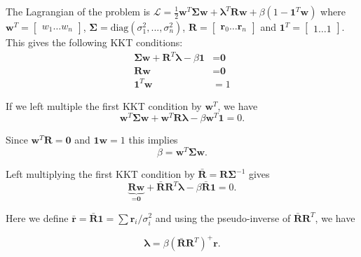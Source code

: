\documentclass[conference]{IEEEtran}
\begin{document}
The Lagrangian of the problem is $\mathcal{L} = \frac{1}{2}\textbf{w}^T \bm{\Sigma} \textbf{w} + \bm{\lambda}^T \textbf{R}\textbf{w} + \beta \left( 1 - \textbf{1}^T \textbf{w} \right)$ where $\textbf{w}^T = \left[\begin{matrix} w_1 \dots w_n \end{matrix}\right]$, $\bm{\Sigma} = \text{diag}(\sigma_1^2, ..., \sigma_n^2)$, $\textbf{R} = \left[\begin{matrix} \textbf{r}_0 \dots \textbf{r}_n\end{matrix}\right]$ and $\textbf{1}^T = \left[\begin{matrix}1 \dots 1\end{matrix}\right]$. This gives the following KKT conditions:
\begin{equation}
\begin{split}
  \bm{\Sigma}\textbf{w} + \textbf{R}^T \bm{\lambda} - \beta \textbf{1} &= \textbf{0} \\
  \textbf{R} \textbf{w} &= \textbf{0} \\
  \textbf{1}^T \textbf{w} &= 1
\end{split}
\end{equation}

\noindent If we left multiple the first KKT condition by $\textbf{w}^T$, we have
\begin{equation}
\textbf{w}^T\bm{\Sigma}\textbf{w} + \textbf{w}^T\textbf{R}\bm{\lambda} - \beta \textbf{w}^T\textbf{1} = 0.
\end{equation}

\noindent Since $\textbf{w}^T\textbf{R} = \textbf{0}$ and $\textbf{1}\textbf{w} = 1$ this implies
\begin{equation}\label{beta}
    \beta = \textbf{w}^T\bm{\Sigma}\textbf{w}.
\end{equation}

\noindent Left multiplying the first KKT condition by $\bar{\textbf{R}} = \textbf{R}\bm{\Sigma}^{-1}$ gives
\begin{equation}
\underbrace{\textbf{R}\textbf{w}}_{=\textbf{0}} + \bar{\textbf{R}}\textbf{R}^T\bm{\lambda} - \beta\bar{\textbf{R}}\textbf{1} = 0.
\end{equation}

\noindent Here we define $\bar{\textbf{r}} = \bar{\textbf{R}}\textbf{1} = \sum{\textbf{r}_i / \sigma_i^2}$ and using the pseudo-inverse of $\bar{\textbf{R}}\textbf{R}^T$, we have

\begin{equation}\label{lambda}
    \bm{\lambda} = \beta \left(\bar{\textbf{R}}\textbf{R}^T\right)^{+} \textbf{r}.
\end{equation}
\end{document}
